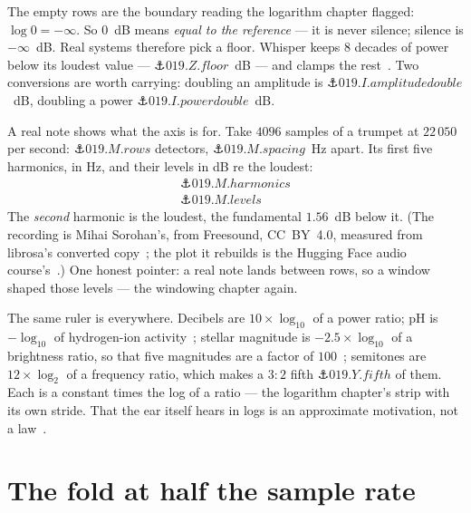 \begin{narrative}
The empty rows are the boundary reading the logarithm chapter flagged:
$\log 0 = -\infty$. So $0$~dB means \emph{equal to the reference} — it
is never silence; silence is $-\infty$~dB. Real systems therefore pick
a floor. Whisper keeps $8$ decades of power below its loudest value —
$\anchor{019.Z.floor}$~dB — and clamps the
rest~\cite{signal_processing-openai-whisper-audio-py-at-8609812}. Two
conversions are worth carrying: doubling an amplitude is
$\anchor{019.I.amplitudedouble}$~dB, doubling a power
$\anchor{019.I.powerdouble}$~dB.

A real note shows what the axis is for. Take $4096$ samples of a
trumpet at $22\,050$ per second: $\anchor{019.M.rows}$ detectors,
$\anchor{019.M.spacing}$~Hz apart. Its first five harmonics, in Hz, and their
levels in dB re the loudest:
\begin{gather*}
  \anchor{019.M.harmonics} \\
  \anchor{019.M.levels}
\end{gather*}
The \emph{second} harmonic is the loudest, the fundamental $1.56$~dB
below it. (The recording is Mihai Sorohan's, from
Freesound, CC~BY~4.0, measured from librosa's converted
copy~\cite{signal_processing-sorohan-solo-trumpet-06in-f-90bpm-wav-freesound,signal_processing-librosa-example-files};
the plot it rebuilds is the Hugging Face audio course's~\cite{signal_processing-hugging-face-audio-course-introduction-to-audio-data}.)
One honest pointer: a real note lands between rows, so a window shaped
those levels — the windowing chapter again.

The same ruler is everywhere. Decibels are $10 \times \log_{10}$ of a
power ratio; pH is $-\log_{10}$ of hydrogen-ion
activity~\cite{signal_processing-buck-et-al-measurement-of-ph-iupac-2002};
stellar magnitude is $-2.5 \times \log_{10}$ of a brightness ratio, so
that five magnitudes are a factor of
$100$~\cite{signal_processing-pogson-magnitudes-of-thirty-six-of-the-minor-planets-1856};
semitones are $12 \times \log_2$ of a frequency ratio, which makes a
$3{:}2$ fifth $\anchor{019.Y.fifth}$ of them. Each is a constant times
the log of a ratio — the logarithm chapter's strip with its own stride.
That the ear itself hears in logs is an approximate motivation, not a
law~\cite{signal_processing-wikipedia-weber-fechner-law}.

\section{The fold at half the sample rate}


\end{narrative}
